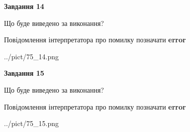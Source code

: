 \documentclass[11pt, ukrainian]{article}
\begin{document}
{\begin {large}
{\begin {center}\textbf{Завдання 14}\end {center}}\par
Що буде виведено за виконання? \par
Повідомлення інтерпретатора про помилку позначати \textbf{error}

\begin{center}
	{../pict/75_14.png}
\end{center}
\newpage

{\begin {center}\textbf{Завдання 15}\end {center}}\par
Що буде виведено за виконання? \par
Повідомлення інтерпретатора про помилку позначати \textbf{error}

\begin{center}
	{../pict/75_15.png}
\end{center}
\newpage

\end {large}}
\end{document}
